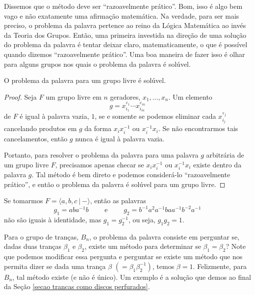	\par\vspace{0.3cm} Dissemos que o método deve ser ``razoavelmente prático''. Bom, isso é algo bem vago 
	e não exatamente uma afirmação matemática. Na verdade, para ser mais preciso, o problema da palavra 
	pertence ao reino da Lógica Matemática ao invés da Teoria dos Grupos. Então, uma primeira investida 
	na direção de uma solução do problema da palavra é tentar deixar claro, matematicamente, o que é possível
	quando dizemos ``razoavelmente prático''. Uma boa maneira de fazer isso é olhar para alguns grupos nos 
	quais o problema da palavra é solúvel.
	\begin{theorem}
	\label{problema da palavra soluvel para grupos livres}
		O problema da palavra para um grupo livre é solúvel.
	\end{theorem}
	\begin{proof}
		Seja $F$ um grupo livre em $n$ geradores, $x_1, \dots, x_n$. Um elemento
		\begin{equation*}
		    g = x_{i_1}^{\varepsilon_1}\cdots x_{i_m}^{\varepsilon_m}
		\end{equation*}
		de $F$ é igual à palavra vazia, $1$, se e somente se podemos eliminar cada
		$x_{i_j}^{\varepsilon_j}$ cancelando produtos em $g$ da forma $x_ix_i^{-1}$ ou $x_i^{-1}x_i$. 
		Se não encontrarmos tais cancelamentos, então $g$ nunca é igual à palavra vazia.
		
		\par\vspace{0.3cm} Portanto, para resolver o problema da palavra para uma palavra $g$ arbitrária de 
		um grupo livre $F$, precisamos apenas checar se $x_ix_i^{-1}$ ou $x_i^{-1}x_i$ existe dentro da 
		palavra $g$. Tal método é bem direto e podemos considerá-lo ``razoavelmente prático'', e então o 
		problema da palavra é solúvel para um grupo livre. 
	\end{proof}
	\begin{example}
    	Se tomarmos $F = \langle a,b,c \ | \ - \rangle$, então as palavras 
    	\begin{equation*}
    	    g_1 = aba^{-1}b \qquad \text{ e } \qquad g_2 = b^{-1}a^2a^{-1}baa^{-1}b^{-2}a^{-1}
    	\end{equation*}
    	não são iguais à identidade, mas $g_1 = g_2^{-1}$, ou seja, $g_1g_2 = 1$.
	\end{example}
	Para o grupo de tranças, $B_n$, o problema da palavra consiste em perguntar se, dadas duas 
	tranças $\beta_1$ e $\beta_2$, existe um método para determinar se $\beta_1 = \beta_2$? Note que 
	podemos modificar essa pergunta e perguntar se existe um método que nos permita dizer se dada uma trança
	$\beta$ $(=\beta_1\beta_2^{-1})$, temos $\beta = 1$. Felizmente, para $B_n$, tal método existe 
	(e não é único). Um exemplo é a solução que demos ao final da 
	Seção \ref{secao trancas como discos perfurados}.
	
